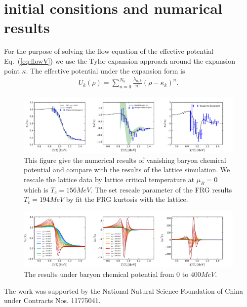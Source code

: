 \documentclass[%
reprint,
superscriptaddress,
showpacs,preprintnumbers,
 amsmath,amssymb,
 aps,
prd,
]{revtex4-1}
\def\Eq#1{Eq.~(\ref{#1})}
\begin{document}
\section{initial consitions and numarical results}
\label{sec:NR}
For the purpose of solving the flow equation of the effective potential \Eq{eq:flowV} we use the Tylor expansion approach around the expansion point $\kappa$. The effective potential under the expansion form is
\begin{align}
U_k(\rho)=\sum^{N_u}_{n=0}\frac{\lambda_{n,k}}{n!}(\rho-\kappa_k)^n.
\end{align}



%
\begin{figure}[t]
\includegraphics[width=1\textwidth]{mub0}
\caption{This figure give the numerical results of vanishing baryon chemical potential and compare with the results of the lattice simulation. We rescale the lattice data by lattice critical temperature at $\mu_B=0$ which is $T_c=156MeV$. The set rescale parameter of the FRG results $T_c=194MeV$ by fit the FRG kurtosis with the lattice.}\label{fig:mub0}
\end{figure}
%
%
\begin{figure}[t]
\includegraphics[width=1\textwidth]{finmub}
\caption{The results under baryon chemical potential from $0$ to $400MeV$.}\label{fig:finmu}
\end{figure}
%

\begin{acknowledgments}

The work was supported by the National Natural Science Foundation of China under Contracts Nos. 11775041.

\end{acknowledgments}
\end{document}
